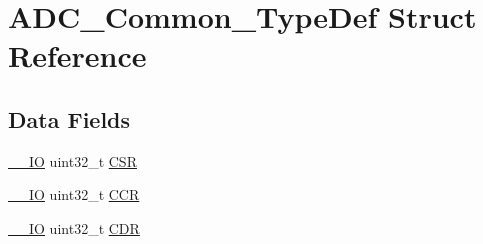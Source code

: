 \hypertarget{struct_a_d_c___common___type_def}{\section{A\-D\-C\-\_\-\-Common\-\_\-\-Type\-Def Struct Reference}
\label{struct_a_d_c___common___type_def}
}
\subsection*{Data Fields}
\begin{DoxyCompactItemize}
\item 
\hyperlink{group___c_m_s_i_s__core__definitions_gaec43007d9998a0a0e01faede4133d6be}{\-\_\-\-\_\-\-I\-O} uint32\-\_\-t \hyperlink{struct_a_d_c___common___type_def_a876dd0a8546697065f406b7543e27af2}{C\-S\-R}
\item 
\hyperlink{group___c_m_s_i_s__core__definitions_gaec43007d9998a0a0e01faede4133d6be}{\-\_\-\-\_\-\-I\-O} uint32\-\_\-t \hyperlink{struct_a_d_c___common___type_def_a5e1322e27c40bf91d172f9673f205c97}{C\-C\-R}
\item 
\hyperlink{group___c_m_s_i_s__core__definitions_gaec43007d9998a0a0e01faede4133d6be}{\-\_\-\-\_\-\-I\-O} uint32\-\_\-t \hyperlink{struct_a_d_c___common___type_def_a760f86a1a18dffffda54fc15a977979f}{C\-D\-R}
\end{DoxyCompactItemize}


